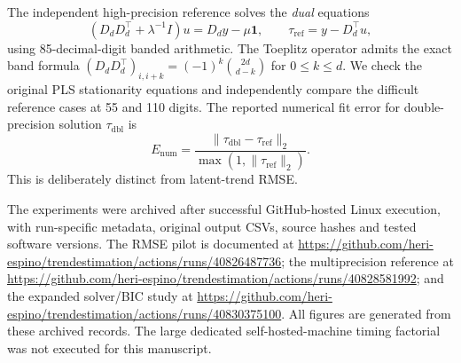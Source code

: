 The independent high-precision reference solves the \emph{dual} equations
\begin{equation}\label{eq:dual}
(D_dD_d^\top+\lambda^{-1}I)u=D_dy-\mu\mathbf1,
\qquad
\tau_{\mathrm{ref}}=y-D_d^\top u,
\end{equation}
using 85-decimal-digit banded arithmetic. The Toeplitz operator admits the exact band formula $(D_dD_d^\top)_{i,i+k}=(-1)^k\binom{2d}{d-k}$ for $0\le k\le d$. We check the original PLS stationarity equations and independently compare the difficult reference cases at 55 and 110 digits. The reported numerical fit error for double-precision solution $\tau_{\mathrm{dbl}}$ is
\begin{equation}\label{eq:relerror}
E_{\mathrm{num}}=
\frac{\|\tau_{\mathrm{dbl}}-\tau_{\mathrm{ref}}\|_2}
{\max(1,\|\tau_{\mathrm{ref}}\|_2)}.
\end{equation}
This is deliberately distinct from latent-trend RMSE.

The experiments were archived after successful GitHub-hosted Linux execution, with run-specific metadata, original output CSVs, source hashes and tested software versions. The RMSE pilot is documented at \url{https://github.com/heri-espino/trendestimation/actions/runs/40826487736}; the multiprecision reference at \url{https://github.com/heri-espino/trendestimation/actions/runs/40828581992}; and the expanded solver/BIC study at \url{https://github.com/heri-espino/trendestimation/actions/runs/40830375100}. All figures are generated from these archived records. The large dedicated self-hosted-machine timing factorial was not executed for this manuscript.
